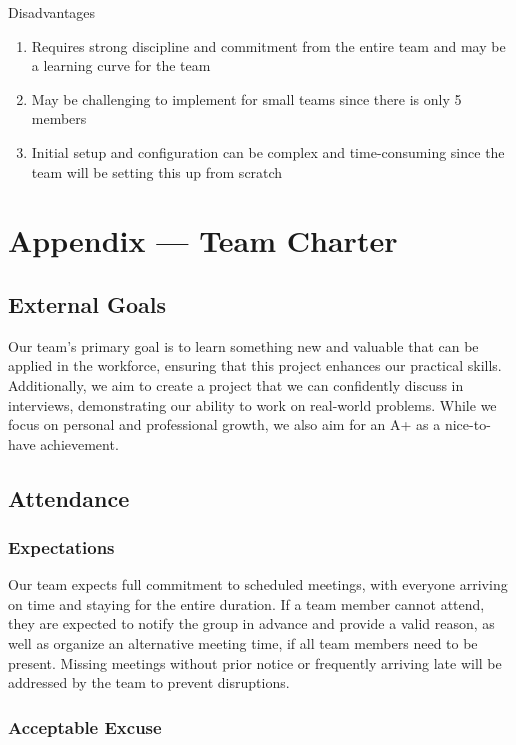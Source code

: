 \documentclass{article}
\begin{document}
    Disadvantages
    \begin{enumerate}
      \item Requires strong discipline and commitment from the entire team and may be a learning curve for the team
      \item May be challenging to implement for small teams since there is only 5 members
      \item Initial setup and configuration can be complex and time-consuming since the team will be setting this up from scratch
    \end{enumerate}

\newpage{}

\section*{Appendix --- Team Charter}

\subsection*{External Goals}

Our team's primary goal is to learn something new and valuable that can be applied in the workforce, 
ensuring that this project enhances our practical skills. Additionally, we aim to create a project 
that we can confidently discuss in interviews, demonstrating our ability to work on real-world 
problems. While we focus on personal and professional growth, we also aim for an A+ as a 
nice-to-have achievement.

\subsection*{Attendance}

\subsubsection*{Expectations}

Our team expects full commitment to scheduled meetings, with everyone arriving on time and staying 
for the entire duration. If a team member cannot attend, they are expected to notify the group in 
advance and provide a valid reason, as well as organize an alternative meeting time, if all team 
members need to be present. Missing meetings without prior notice or frequently arriving late 
will be addressed by the team to prevent disruptions.

\subsubsection*{Acceptable Excuse}
\end{document}
